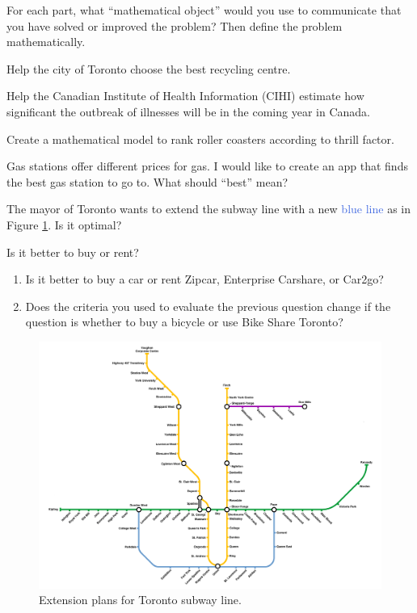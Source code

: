 \question
\label{object}
For each part, what ``mathematical object'' would you use to communicate that you have solved or improved the problem? Then define the problem mathematically.
\begin{parts}
	\item Help the city of Toronto choose the best recycling centre.
	\item Help the Canadian Institute of Health Information (CIHI) estimate how significant the outbreak of illnesses will be in the coming year in Canada.
	\item Create a mathematical model to rank roller coasters according to thrill factor.
	\item Gas stations offer different prices for gas. I would like to create an app that finds the best gas station to go to. What should ``best'' mean?
	\item The mayor of Toronto wants to extend the subway line with a new \textcolor{RoyalBlue}{blue line} as in Figure \ref{TTC}. Is it optimal?
	
	\item Is it better to buy or rent? 
	\begin{enumerate}
		\item Is it better to buy a car or rent Zipcar, Enterprise Carshare, or Car2go?
		\item Does the criteria you used to evaluate the previous question change if the question is whether to buy a bicycle or use Bike Share Toronto? 
	\end{enumerate}

	\begin{center}
	\begin{figure}[!htbp]
	\includegraphics*[width=500pt]{images/TTC-extension.png}
	\caption{Extension plans for Toronto subway line.}
	\label{TTC}	
	\end{figure}
	\end{center}
	
\end{parts}








